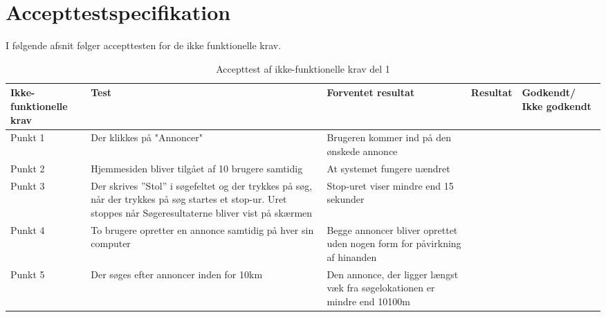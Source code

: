 \chapter{Accepttestspecifikation}\label{ch:Accepttestspecifikation}
I følgende afsnit følger accepttesten for de ikke funktionelle krav.

\setlength{\arrayrulewidth}{0.3mm}
\setlength{\tabcolsep}{12pt}
\renewcommand{\arraystretch}{1.5}
\begin{table}[H]
	\begin{tabular}{ |p{2.3cm}|p{2.2cm}|p{2.2cm}|p{2.2cm}|p{2.2cm}| } 
		\hline
		\textbf{Ikke-funktionelle krav} & \textbf{Test} & \textbf{Forventet resultat} & \textbf{Resultat} & \textbf{Godkendt/ Ikke godkendt} \\
		\hline
		Punkt 1 & Der klikkes på "Annoncer"  & Brugeren kommer ind på den ønskede annonce &  & \\
		\hline
		Punkt 2 & Hjemmesiden bliver tilgået af 10 brugere samtidig & At systemet fungere uændret &  &  \\
		\hline
		Punkt 3 & Der skrives ''Stol'' i søgefeltet og der trykkes på søg, når der trykkes på søg startes et stop-ur. Uret stoppes når Søgeresultaterne bliver vist på skærmen & Stop-uret viser mindre end 15 sekunder &  &  \\
		\hline
		Punkt 4 & To brugere opretter en annonce samtidig på hver sin computer & Begge annoncer bliver oprettet uden nogen form for påvirkning af hinanden  &  & \\
		\hline
		Punkt 5 & Der søges efter annoncer inden for 10km & Den annonce, der ligger længst væk fra søgelokationen er mindre end 10100m &  &  \\
		\hline 
	\end{tabular}
	\caption{Accepttest af ikke-funktionelle krav del 1}
	\label{table:accepttest_ifk1}
\end{table}

